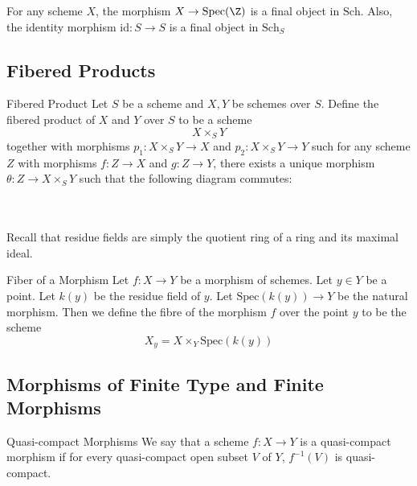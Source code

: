 \documentclass[a4paper]{article}
\begin{document}
\begin{lmm}{}{} For any scheme $X$, the morphism $X\to\text{Spec}(\Z)$ is a final object in $\text{Sch}$. Also, the identity morphism $\text{id}:S\to S$ is a final object in $\text{Sch}_S$
\end{lmm}


\subsection{Fibered Products}
\begin{defn}{Fibered Product}{} Let $S$ be a scheme and $X,Y$ be schemes over $S$. Define the fibered product of $X$ and $Y$ over $S$ to be a scheme $$X\times_SY$$ together with morphisms $p_1:X\times_SY\to X$ and $p_2:X\times_SY\to Y$ such for any scheme $Z$ with morphisms $f:Z\to X$ and $g:Z\to Y$, there exists a unique morphism $\theta:Z\to X\times_SY$ such that the following diagram commutes: \\~\\
 \\
\end{defn}

Recall that residue fields are simply the quotient ring of a ring and its maximal ideal. 

\begin{defn}{Fiber of a Morphism}{} Let $f:X\to Y$ be a morphism of schemes. Let $y\in Y$ be a point. Let $k(y)$ be the residue field of $y$. Let $\text{Spec}(k(y))\to Y$ be the natural morphism. Then we define the fibre of the morphism $f$ over the point $y$ to be the scheme $$X_y=X\times_Y\text{Spec}(k(y))$$
\end{defn}

\subsection{Morphisms of Finite Type and Finite Morphisms}
\begin{defn}{Quasi-compact Morphisms}{} We say that a scheme $f:X\to Y$ is a quasi-compact morphism if for every quasi-compact open subset $V$ of $Y$, $f^{-1}(V)$ is quasi-compact. 
\end{defn}
\end{document}
